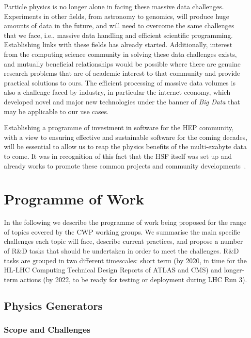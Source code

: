 \documentclass[12pt,a4paper]{article}
\begin{document}
Particle physics is no longer alone in facing these massive data
challenges. Experiments in other fields, from astronomy to genomics,
will produce huge amounts of data in the future, and will need to
overcome the same challenges that we face, i.e., massive data handling and
efficient scientific programming. Establishing links with these fields
has already started. Additionally, interest from the computing science
community in solving these data challenges exists, and mutually
beneficial relationships would be possible where there are genuine
research problems that are of academic interest to that community and
provide practical solutions to ours. The efficient processing of massive
data volumes is also a challenge faced by industry, in particular the
internet economy, which developed novel and major new technologies under
the banner of \emph{Big Data} that may be applicable to our use cases.

Establishing a programme of investment in software for the HEP
community, with a view to ensuring effective and sustainable software
for the coming decades, will be essential to allow us to reap the
physics benefits of the multi-exabyte data to come. It was in recognition of
this fact that the HSF itself was set up and already works to promote
these common projects and community developments~\cite{HSF2015}.

\hypertarget{programme-of-work}{%
\section{Programme of Work}\label{programme-of-work}}

In the following we describe the programme of work being proposed for
the range of topics covered by the CWP working groups. We summarise the
main specific challenges each topic will face, describe current
practices, and propose a number of R\&D tasks that should be undertaken
in order to meet the challenges. R\&D tasks are grouped in two different
timescales: short term (by 2020, in time for the HL-LHC Computing Technical Design Reports of
ATLAS and CMS) and longer-term actions (by 2022, to be ready for testing
or deployment during LHC Run 3).


\hypertarget{physics-generators}{%
\subsection{Physics Generators}\label{physics-generators}}

\subsubsection*{Scope and Challenges}
\end{document}
